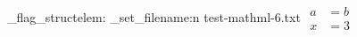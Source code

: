 \documentclass{article}
\begin{document}
\ExplSyntaxOn
\luamml_flag_structelem:  \luamml_set_filename:n {test-mathml-6.txt} 
\ExplSyntaxOff
$
\begin{array}{ll}
a & = b \\
x & = 3
\end{array}
$
\end{document}
